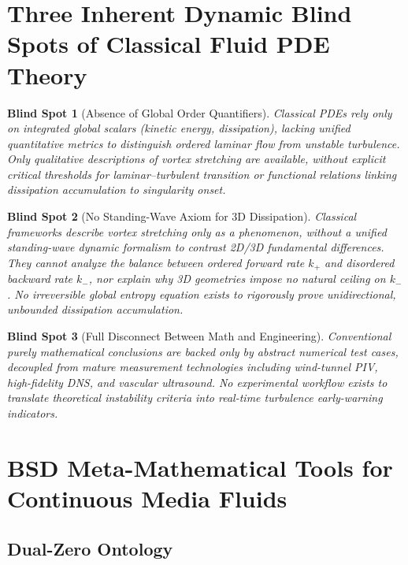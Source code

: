\documentclass[11pt,a4paper]{article}
\newtheorem{blindspot}{Blind Spot}
\theoremstyle{remark}
\newcommand{\kplus}{k_{+}}
\newcommand{\kminus}{k_{-}}
\begin{document}
\section{Three Inherent Dynamic Blind Spots of Classical Fluid PDE Theory}\label{sec:blindspots}

\begin{blindspot}[Absence of Global Order Quantifiers]\label{bs:one}
Classical PDEs rely only on integrated global scalars (kinetic energy, dissipation), lacking unified quantitative metrics to distinguish ordered laminar flow from unstable turbulence. Only qualitative descriptions of vortex stretching are available, without explicit critical thresholds for laminar--turbulent transition or functional relations linking dissipation accumulation to singularity onset.
\end{blindspot}

\begin{blindspot}[No Standing-Wave Axiom for 3D Dissipation]\label{bs:two}
Classical frameworks describe vortex stretching only as a phenomenon, without a unified standing-wave dynamic formalism to contrast 2D/3D fundamental differences. They cannot analyze the balance between ordered forward rate $\kplus$ and disordered backward rate $\kminus$, nor explain why 3D geometries impose no natural ceiling on $\kminus$. No irreversible global entropy equation exists to rigorously prove unidirectional, unbounded dissipation accumulation.
\end{blindspot}

\begin{blindspot}[Full Disconnect Between Math and Engineering]\label{bs:three}
Conventional purely mathematical conclusions are backed only by abstract numerical test cases, decoupled from mature measurement technologies including wind-tunnel PIV, high-fidelity DNS, and vascular ultrasound. No experimental workflow exists to translate theoretical instability criteria into real-time turbulence early-warning indicators.
\end{blindspot}

\section{BSD Meta-Mathematical Tools for Continuous Media Fluids}\label{sec:bsd-tools}

\subsection{Dual-Zero Ontology}\label{sec:dual-zero}
\end{document}
